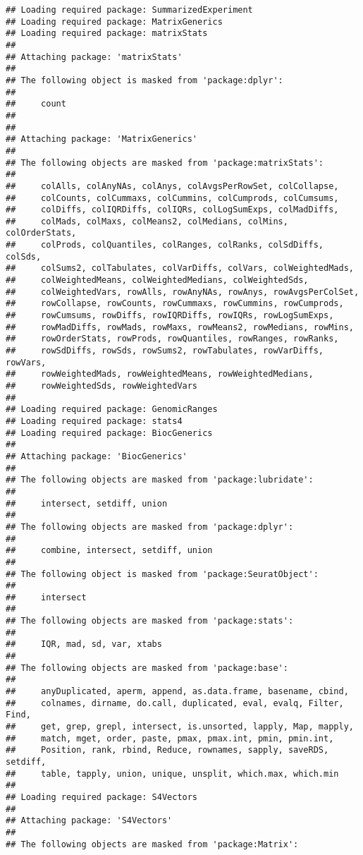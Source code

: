 \documentclass[
]{article}
\begin{document}
\begin{verbatim}
## Loading required package: SummarizedExperiment
## Loading required package: MatrixGenerics
## Loading required package: matrixStats
## 
## Attaching package: 'matrixStats'
## 
## The following object is masked from 'package:dplyr':
## 
##     count
## 
## 
## Attaching package: 'MatrixGenerics'
## 
## The following objects are masked from 'package:matrixStats':
## 
##     colAlls, colAnyNAs, colAnys, colAvgsPerRowSet, colCollapse,
##     colCounts, colCummaxs, colCummins, colCumprods, colCumsums,
##     colDiffs, colIQRDiffs, colIQRs, colLogSumExps, colMadDiffs,
##     colMads, colMaxs, colMeans2, colMedians, colMins, colOrderStats,
##     colProds, colQuantiles, colRanges, colRanks, colSdDiffs, colSds,
##     colSums2, colTabulates, colVarDiffs, colVars, colWeightedMads,
##     colWeightedMeans, colWeightedMedians, colWeightedSds,
##     colWeightedVars, rowAlls, rowAnyNAs, rowAnys, rowAvgsPerColSet,
##     rowCollapse, rowCounts, rowCummaxs, rowCummins, rowCumprods,
##     rowCumsums, rowDiffs, rowIQRDiffs, rowIQRs, rowLogSumExps,
##     rowMadDiffs, rowMads, rowMaxs, rowMeans2, rowMedians, rowMins,
##     rowOrderStats, rowProds, rowQuantiles, rowRanges, rowRanks,
##     rowSdDiffs, rowSds, rowSums2, rowTabulates, rowVarDiffs, rowVars,
##     rowWeightedMads, rowWeightedMeans, rowWeightedMedians,
##     rowWeightedSds, rowWeightedVars
## 
## Loading required package: GenomicRanges
## Loading required package: stats4
## Loading required package: BiocGenerics
## 
## Attaching package: 'BiocGenerics'
## 
## The following objects are masked from 'package:lubridate':
## 
##     intersect, setdiff, union
## 
## The following objects are masked from 'package:dplyr':
## 
##     combine, intersect, setdiff, union
## 
## The following object is masked from 'package:SeuratObject':
## 
##     intersect
## 
## The following objects are masked from 'package:stats':
## 
##     IQR, mad, sd, var, xtabs
## 
## The following objects are masked from 'package:base':
## 
##     anyDuplicated, aperm, append, as.data.frame, basename, cbind,
##     colnames, dirname, do.call, duplicated, eval, evalq, Filter, Find,
##     get, grep, grepl, intersect, is.unsorted, lapply, Map, mapply,
##     match, mget, order, paste, pmax, pmax.int, pmin, pmin.int,
##     Position, rank, rbind, Reduce, rownames, sapply, saveRDS, setdiff,
##     table, tapply, union, unique, unsplit, which.max, which.min
## 
## Loading required package: S4Vectors
## 
## Attaching package: 'S4Vectors'
## 
## The following objects are masked from 'package:Matrix':

\end{verbatim}
\end{document}
